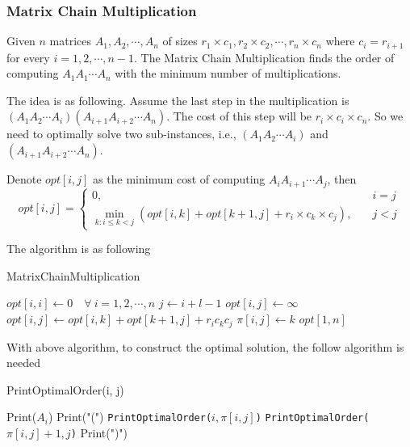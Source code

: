 				\subsubsection{Matrix Chain Multiplication}
					Given $n$ matrices $A_1, A_2, \cdots, A_n$ of sizes $r_1 \times c_1, r_2 \times c_2, \cdots, r_n \times c_n$ where $c_i = r_{i + 1}$ for every $i = 1, 2, \cdots, n - 1$. The Matrix Chain Multiplication finds the order of computing $A_1A_1\cdots A_n$ with the minimum number of multiplications.

					The idea is as following. Assume the last step in the multiplication is $(A_1A_2\cdots A_i)(A_{i + 1}A_{i + 2}\cdots A_n)$. The cost of this step will be $r_i \times c_i \times c_n$. So we need to optimally solve two sub-instances, i.e., $(A_1A_2\cdots A_i)$ and $(A_{i + 1}A_{i + 2}\cdots A_n)$.

					Denote $opt[i, j]$ as the minimum cost of computing $A_i A_{i+1} \cdots A_j$, then
					\begin{equation}
						opt[i, j] = \begin{cases}
							0, & \quad i = j\\
							\min_{k: i \le k < j} (opt[i, k] + opt[k + 1, j] + r_i \times c_k \times c_j), & \quad j < j
						\end{cases}
					\end{equation}

					The algorithm is as following
					\begin{algorithm}[h]
						\caption{MatrixChainMultiplication}
						\begin{algorithmic}[1]
							\State $opt[i, i] \gets 0 \quad \forall ~ i = 1, 2, \cdots, n$
									\State $j \gets i + l - 1$
									\State $opt[i, j] \gets \infty$
										\If {$opt[i, k] + opt[k + 1, j + r_ic_kc_j < opt[i, j]$}
											\State $opt[i, j] \gets opt[i, k] + opt[k + 1, j] + r_i c_k c_j$
											\State $\pi[i, j] \gets k$
										\EndIf
									\EndFor
								\EndFor
							\EndFor
							\State \Return $opt[1, n]$
						\end{algorithmic}
					\end{algorithm}

					With above algorithm, to construct the optimal solution, the follow algorithm is needed
					\begin{algorithm}[h]
						\caption{PrintOptimalOrder(i, j)}
						\begin{algorithmic}[1]
								\State Print($A_i$)
							\Else
								\State Print("(")
								\State \texttt{PrintOptimalOrder($i, \pi[i, j]$)}
								\State \texttt{PrintOptimalOrder($\pi[i, j] + 1, j$)}
								\State Print(")")
							\EndIf
						\end{algorithmic}
					\end{algorithm}
				
